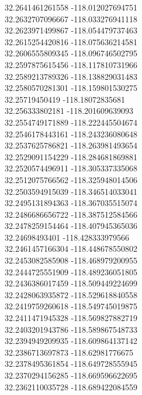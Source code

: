 {32.2641461261558	-118.012027694751\\
32.2632707096667	-118.033276941118\\
32.2623971499867	-118.054479737463\\
32.2615254420816	-118.075636214581\\
32.2606555809345	-118.096746502795\\
32.2597875615456	-118.117810731966\\
32.2589213789326	-118.138829031483\\
32.2580570281301	-118.159801530275\\
32.25719450419	-118.18072835681\\
32.256333802181	-118.201609639093\\
32.2554749171889	-118.222445504674\\
32.2546178443161	-118.243236080648\\
32.2537625786821	-118.263981493654\\
32.2529091154229	-118.284681869881\\
32.2520574496911	-118.305337335068\\
32.2512075766562	-118.325948014506\\
32.2503594915039	-118.346514033041\\
32.2495131894363	-118.367035515074\\
32.2486686656722	-118.387512584566\\
32.2478259154464	-118.407945365036\\
32.24698493401	-118.428333979566\\
32.2461457166304	-118.448678550802\\
32.2453082585908	-118.468979200955\\
32.2444725551909	-118.489236051805\\
32.2436386017459	-118.509449224699\\
32.2428063935872	-118.529618840558\\
32.2419759260618	-118.549745019875\\
32.2411471945328	-118.569827882719\\
32.2403201943786	-118.589867548733\\
32.2394949209935	-118.609864137142\\
32.2386713697873	-118.62981776675\\
32.2378495361854	-118.649728555945\\
32.2370294156285	-118.669596622695\\
32.2362110035728	-118.689422084559\\
}
